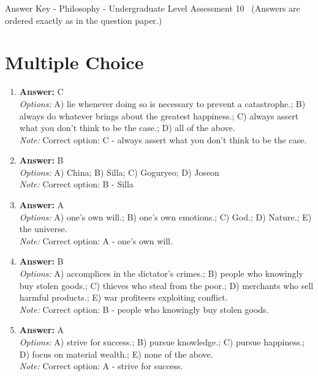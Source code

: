 \documentclass[12pt]{article}
\begin{document}
\begin{center}
Answer Key - Philosophy - Undergraduate Level Assessment 10 \
\small (Answers are ordered exactly as in the question paper.)
\end{center}

\section*{Multiple Choice}
\begin{enumerate}[label=\arabic*.]
\item \textbf{Answer:} C
\\ \textit{Options:} A) lie whenever doing so is necessary to prevent a catastrophe.; B) always do whatever brings about the greatest happiness.; C) always assert what you don't think to be the case.; D) all of the above.
\\ \textit{Note:} Correct option: C - always assert what you don't think to be the case.
\item \textbf{Answer:} B
\\ \textit{Options:} A) China; B) Silla; C) Goguryeo; D) Joseon
\\ \textit{Note:} Correct option: B - Silla
\item \textbf{Answer:} A
\\ \textit{Options:} A) one's own will.; B) one's own emotions.; C) God.; D) Nature.; E) the universe.
\\ \textit{Note:} Correct option: A - one's own will.
\item \textbf{Answer:} B
\\ \textit{Options:} A) accomplices in the dictator's crimes.; B) people who knowingly buy stolen goods.; C) thieves who steal from the poor.; D) merchants who sell harmful products.; E) war profiteers exploiting conflict.
\\ \textit{Note:} Correct option: B - people who knowingly buy stolen goods.
\item \textbf{Answer:} A
\\ \textit{Options:} A) strive for success.; B) pursue knowledge.; C) pursue happiness.; D) focus on material wealth.; E) none of the above.
\\ \textit{Note:} Correct option: A - strive for success.
\end{enumerate}
\end{document}
